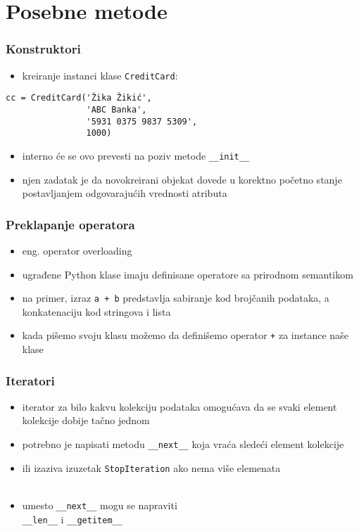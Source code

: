 \documentclass[compress,aspectratio=169]{beamer}
\begin{document}
\section[Posebne metode]{Posebne metode}
\begin{frame}[fragile]
  \frametitle{Konstruktori}
  \begin{itemize}
    \item kreiranje instanci klase \texttt{CreditCard}: 
  \end{itemize}
\begin{verbatim}
cc = CreditCard('Žika Žikić', 
                'ABC Banka', 
                '5931 0375 9837 5309', 
                1000)
\end{verbatim}
  \begin{itemize}
    \item interno će se ovo prevesti na poziv metode \texttt{\_\_init\_\_}
    \item njen zadatak je da novokreirani objekat dovede u korektno početno stanje postavljanjem odgovarajućih vrednosti atributa
  \end{itemize}
\end{frame}

\begin{frame}[fragile]
  \frametitle{Preklapanje operatora}
  \begin{itemize}
    \item eng. operator overloading
    \item ugrađene Python klase imaju definisane operatore sa prirodnom semantikom
    \item na primer, izraz \texttt{a + b} predstavlja sabiranje kod brojčanih podataka, a konkatenaciju kod stringova i lista
    \item kada pišemo svoju klasu možemo da definišemo operator \texttt{+} za instance naše klase   
  \end{itemize}
\end{frame}

\begin{frame}[fragile]
  \frametitle{Iteratori}
  \begin{itemize}
    \item iterator za bilo kakvu kolekciju podataka omogućava da se svaki element kolekcije dobije tačno jednom
    \item potrebno je napisati metodu \texttt{\_\_next\_\_} koja vraća sledeći element kolekcije 
    \item ili izaziva izuzetak \texttt{StopIteration} ako nema više elemenata \\ \ \\
    \item umesto \texttt{\_\_next\_\_} mogu se napraviti \\ \texttt{\_\_len\_\_} i \texttt{\_\_getitem\_\_}
  \end{itemize}
\end{frame}
\end{document}
